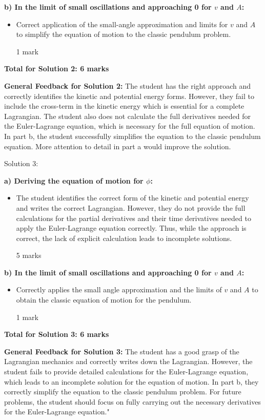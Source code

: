 \documentclass[a4paper,11pt]{article}
\begin{document}
\textbf{b) In the limit of small oscillations and approaching 0 for \( v \) and \( A \):}
\begin{itemize}
    \item Correct application of the small-angle approximation and limits for \( v \) and \( A \) to simplify the equation of motion to the classic pendulum problem.
    \item[1 mark]
\end{itemize}

\textbf{Total for Solution 2: 6 marks}

\textbf{General Feedback for Solution 2:}
The student has the right approach and correctly identifies the kinetic and potential energy forms. However, they fail to include the cross-term in the kinetic energy which is essential for a complete Lagrangian. The student also does not calculate the full derivatives needed for the Euler-Lagrange equation, which is necessary for the full equation of motion. In part b, the student successfully simplifies the equation to the classic pendulum equation. More attention to detail in part a would improve the solution.

Solution 3:

\textbf{a) Deriving the equation of motion for \( \phi \):}
\begin{itemize}
    \item The student identifies the correct form of the kinetic and potential energy and writes the correct Lagrangian. However, they do not provide the full calculations for the partial derivatives and their time derivatives needed to apply the Euler-Lagrange equation correctly. Thus, while the approach is correct, the lack of explicit calculation leads to incomplete solutions.
    \item[5 marks]
\end{itemize}

\textbf{b) In the limit of small oscillations and approaching 0 for \( v \) and \( A \):}
\begin{itemize}
    \item Correctly applies the small angle approximation and the limits of \( v \) and \( A \) to obtain the classic equation of motion for the pendulum.
    \item[1 mark]
\end{itemize}

\textbf{Total for Solution 3: 6 marks}

\textbf{General Feedback for Solution 3:}
The student has a good grasp of the Lagrangian mechanics and correctly writes down the Lagrangian. However, the student fails to provide detailed calculations for the Euler-Lagrange equation, which leads to an incomplete solution for the equation of motion. In part b, they correctly simplify the equation to the classic pendulum problem. For future problems, the student should focus on fully carrying out the necessary derivatives for the Euler-Lagrange equation."
\end{document}
